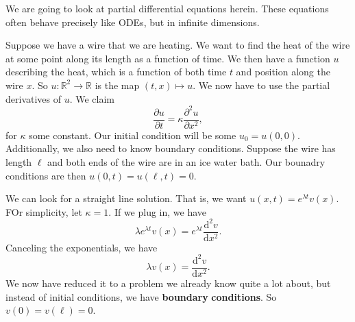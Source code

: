 We are going to look at partial differential equations herein. These equations often behave precisely like ODEs, but in infinite dimensions.

Suppose we have a wire that we are heating. We want to find the heat of the wire at some point along its length as a function of time. We then have a function $u$ describing the heat, which is a function of both time $t$ and position along the wire $x$. So $u : \mathbb{R}^2 \to \mathbb{R}$ is the map $(t,x)\mapsto u$. We now have to use the partial derivatives of $u$. We claim
\[
	\frac{\partial u}{\partial t} =\kappa \frac{\partial ^2u}{\partial x^2} 
,\]
for $\kappa $ some constant. Our initial condition will be some $u_0=u(0,0)$. Additionally, we also need to know boundary conditions. Suppose the wire has length $\ell $ and both ends of the wire are in an ice water bath. Our bounadry conditions are then $u(0,t)=u(\ell ,t)=0$.

We can look for a straight line solution. That is, we want $u(x,t)=e^{\lambda t}v(x)$. FOr simplicity, let $\kappa =1$. If we plug in, we have
\[
	\lambda e^{\lambda t}v(x)=e^{\lambda t} \frac{\mathrm{d}^2v}{\mathrm{d}x^2} 
.\]
Canceling the exponentials, we have
\[
	\lambda v(x)=\frac{\mathrm{d}^2v}{\mathrm{d}x^2} 
.\]
We now have reduced it to a problem we already know quite a lot about, but instead of initial conditions, we have \textbf{boundary} \textbf{conditions}. So $v(0)=v(\ell )=0$.

